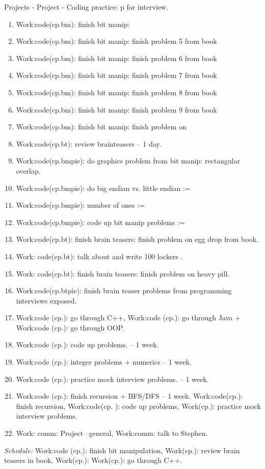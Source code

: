 \documentclass[serif, mathserif, final]{beamer}
\begin{document}
\begin{frame}
\begin{columns}
\begin{block}{Projects}
- Project - Coding practice: p for interview.
\begin{enumerate} 
\tiny \item \tiny Work:code(cp.bm): finish bit manip:  
\item \tiny Work:code(cp.bm): finish bit manip:  finish problem 5 from book 
\item \tiny Work:code(cp.bm): finish bit manip:  finish problem 6 from book 
\item \tiny Work:code(cp.bm): finish bit manip:  finish problem 7 from book
\item \tiny Work:code(cp.bm): finish bit manip:  finish problem 8 from book  
\item \tiny Work:code(cp.bm): finish bit manip:  finish problem 9 from book 
\item \tiny Work:code(cp.bm): finish bit manip:  finish problem on
\item \tiny Work:code(cp.bt): review brainteasers – 1 day. 
\item \tiny Work:code(cp.bmpie): do graphics problem from bit manip:
  rectangular overlap. 
\item \tiny Work:code(cp.bmpie): do big endian vs. little endian := 
\item \tiny Work:code(cp.bmpie): number of ones  := 
\item \tiny Work:code(cp.bmpie): code up bit manip problems :=  
\item \tiny Work:code(cp.bt): finish brain teasers:  finish problem on
  egg drop from book.  
\item\tiny Work: code(cp.bt): talk about and write 100 lockers . 
\item \tiny Work: code(cp.bt):  finish brain teasers: finish problem on heavy
pill. 
\item \tiny Work:code(cp.btpie): finish brain teaser problems from
  programming interviews exposed. 
\item \tiny Work:code (cp.): go through C++, Work:code (cp.): go through Java +
Work:code (cp.): go through OOP. 
\item \tiny Work:code (cp.): code up problems.  – 1 week. 
\item \tiny Work:code (cp.): integer problems + numerics   -- 1 week. 
\item \tiny Work:code (cp.): practice mock interview problems. – 1 week.   
\item \tiny Work:code (cp.): finish recursion + BFS/DFS – 1 week. 
Work:code(cp.): finish recursion, Work:code(cp. ): code up problems,
Work(cp.): practice mock interview problems. 
\item \tiny Work: comm: Project –general,  Work:comm: talk to Stephen.
\end{enumerate} 
\textit{Schedule:} Work:code (cp.): finish bit manipulation, Work(cp.): review
brain teasers in book, Work(cp.): Work(cp.): go through C++.  \\ 


\end{block}
\end{columns}
\end{frame}
\end{document}
